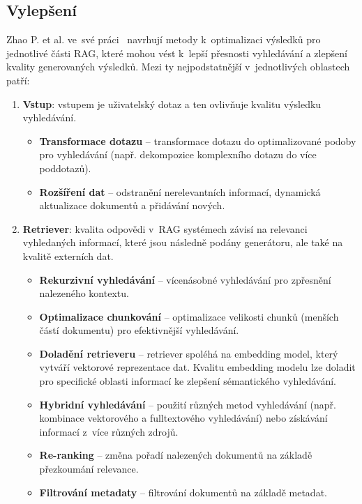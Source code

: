 \subsection{Vylepšení}
Zhao P. et al. ve~své práci~\cite{zhao2024rag} navrhují metody k~optimalizaci výsledků pro jednotlivé části RAG, které mohou vést k~lepší přesnosti vyhledávání a zlepšení kvality generovaných výsledků. Mezi ty nejpodstatnější v~jednotlivých oblastech patří:

\begin{enumerate}
    \item \textbf{Vstup}: vstupem je uživatelský dotaz a ten ovlivňuje kvalitu výsledku vyhledávání.
    \begin{itemize}
        \item \textbf{Transformace dotazu} – transformace dotazu do optimalizované podoby pro vyhledávání (např. dekompozice komplexního dotazu do více poddotazů).
        \item \textbf{Rozšíření dat} – odstranění nerelevantních informací, dynamická aktualizace dokumentů a přidávání nových.
    \end{itemize}
    
    \item \textbf{Retriever}: kvalita odpovědi v~RAG systémech závisí na relevanci vyhledaných informací, které jsou následně podány generátoru, ale také na kvalitě externích dat.
    \begin{itemize}
        \item \textbf{Rekurzivní vyhledávání} – vícenásobné vyhledávání pro zpřesnění nalezeného kontextu.
        \item \textbf{Optimalizace chunkování} – optimalizace velikosti chunků (menších částí dokumentu) pro efektivnější vyhledávání.
        \item \textbf{Doladění retrieveru} – retriever spoléhá na embedding model, který vytváří vektorové reprezentace dat. Kvalitu embedding modelu lze doladit pro specifické oblasti informací ke zlepšení sémantického vyhledávání.
        \item \textbf{Hybridní vyhledávání} – použití různých metod vyhledávání (např. kombinace vektorového a fulltextového vyhledávání) nebo získávání informací z~více různých zdrojů.
        \item \textbf{Re-ranking} – změna pořadí nalezených dokumentů na základě přezkoumání relevance.
        \item \textbf{Filtrování metadaty} – filtrování dokumentů na základě metadat.
    \end{itemize}
    

\end{enumerate}

